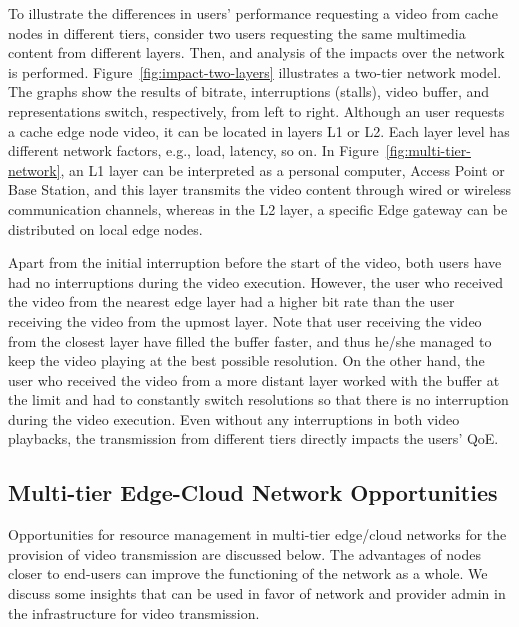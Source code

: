 To illustrate the differences in users' performance requesting a video from cache nodes in different tiers, consider two users requesting the same multimedia content from different layers. Then, and analysis of the impacts over the network is performed.  Figure~\ref{fig:impact-two-layers} illustrates a two-tier network model. The graphs show the results of bitrate, interruptions (stalls), video buffer, and representations switch, respectively, from left to right.%
Although an user requests a cache edge node video, it can be located in layers L1 or L2. Each layer level has different network factors, e.g., load, latency, so on. In Figure~\ref{fig:multi-tier-network}, an L1 layer can be interpreted as a personal computer, Access Point or Base Station, and this layer transmits the video content through wired or wireless communication channels, whereas in the L2 layer, a specific Edge gateway can be distributed on local edge nodes.

Apart from the initial interruption before the start of the video, both users have had no interruptions during the video execution. However, the user who received the video from the nearest edge layer had a higher bit rate than the user receiving the video from the upmost layer.
Note that user receiving the video from the closest layer have filled the buffer faster, and thus he/she managed to keep the video playing at the best possible resolution.
On the other hand, the user who received the video from a more distant layer worked with the buffer at the limit and had to constantly switch resolutions so that there is no interruption during the video execution. Even without any interruptions in both video playbacks, the transmission from different tiers directly impacts the users' QoE.


\subsection{Multi-tier Edge-Cloud Network Opportunities}

Opportunities for resource management in multi-tier edge/cloud networks for the provision of video transmission are discussed below. The advantages of nodes closer to end-users can improve the functioning of the network as a whole. We discuss some insights that can be used in favor of network and provider admin in the infrastructure for video transmission.

